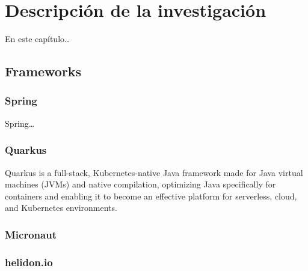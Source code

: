\chapter{Descripción de la investigación}

En este capítulo\dots

\section{Frameworks}



\subsection{Spring}

Spring\dots

\subsection{Quarkus}

Quarkus is a full-stack, Kubernetes-native Java framework made for Java virtual machines (JVMs) and native compilation, optimizing Java specifically for containers and enabling it to become an effective platform for serverless, cloud, and Kubernetes environments.
\cite{WhatisQu51:online}\\

\subsection{Micronaut}



\subsection{helidon.io}

